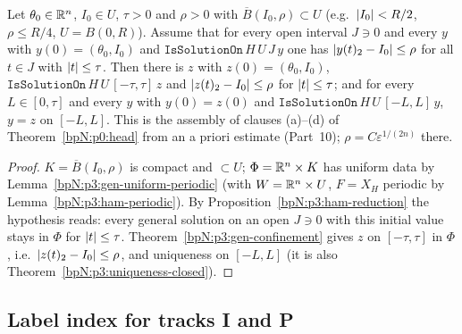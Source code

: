 \begin{theorem}\label{bpN:p3:confinement-glue}
Let $\theta_0\in\mathbb{R}^n$, $I_0\in U$, $\tau>0$ and $\rho>0$ with $\overline B(I_0,\rho)\subset U$ (e.g.\ $\lvert I_0\rvert<R/2$, $\rho\le R/4$, $U=B(0,R)$).
Assume that for every open interval $J\ni0$ and every $y$ with $y(0)=(\theta_0,I_0)$ and $\texttt{IsSolutionOn}\,H\,U\,J\,y$ one has
$\lvert y(t)_2-I_0\rvert\le\rho$ for all $t\in J$ with $\lvert t\rvert\le\tau$. Then there is $z$ with $z(0)=(\theta_0,I_0)$,
$\texttt{IsSolutionOn}\,H\,U\,[-\tau,\tau]\,z$ and $\lvert z(t)_2-I_0\rvert\le\rho$ for $\lvert t\rvert\le\tau$; and for every $L\in[0,\tau]$ and every
$y$ with $y(0)=z(0)$ and $\texttt{IsSolutionOn}\,H\,U\,[-L,L]\,y$, $y=z$ on $[-L,L]$.
This is the assembly of clauses (a)--(d) of Theorem~\ref{bpN:p0:head} from an a priori estimate (Part~10); $\rho=C\varepsilon^{1/(2n)}$ there.
\end{theorem}
\begin{proof}
\label{stepN:p3:cg-set} $K=\overline B(I_0,\rho)$ is compact and $\subset U$; $\Phi=\mathbb{R}^n\times K$ has uniform data by Lemma~\ref{bpN:p3:gen-uniform-periodic} (with $W=\mathbb{R}^n\times U$, $F=X_H$ periodic by Lemma~\ref{bpN:p3:ham-periodic}).
\label{stepN:p3:cg-glue} By Proposition~\ref{bpN:p3:ham-reduction} the hypothesis reads: every general solution on an open $J\ni0$ with this initial value stays in $\Phi$ for $\lvert t\rvert\le\tau$.
Theorem~\ref{bpN:p3:gen-confinement} gives $z$ on $[-\tau,\tau]$ in $\Phi$, i.e.\ $\lvert z(t)_2-I_0\rvert\le\rho$, and uniqueness on $[-L,L]$ (it is also Theorem~\ref{bpN:p3:uniqueness-closed}).
\end{proof}

\subsection{Label index for tracks I and P}\label{bpN:p3:s-index}


